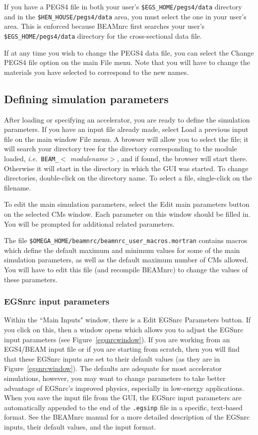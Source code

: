 \documentclass[12pt,twoside]{article}
\newcommand{\ie}{{\em i.e.}}
\begin{document}
If you have a PEGS4 file in both your user's {\tt \$EGS\_HOME/pegs4/data}
directory
and in the {\tt \$HEN\_HOUSE/pegs4/data} area, you must select the
one in your user's area.  This is
enforced because BEAMnrc first searches your user's {\tt \$EGS\_HOME/pegs4/data}
directory for the cross-sectional data file.

If at any time you wish to change the PEGS4 data file, you can select
the {\sf Change PEGS4 file} option on the main {\sf File} menu.  Note that you
will have to change the materials you have selected to correspond to the
new names.

\subsection{Defining simulation parameters}

After loading or specifying an accelerator, you are ready to define the
simulation parameters.  If
you have an input file already made, select {\sf Load a previous input
file} on the main window {\sf File} menu.  A browser will allow you to select
the file; it will search your directory tree for the directory
corresponding to the module loaded, \ie~{\tt BEAM\_}$<${\em
modulename}$>$, and if found, the browser will start
there.  Otherwise it will start in the directory in which the GUI was
started.  To change directories, double-click on the directory name.  To
select a file, single-click on the filename.

To edit the main simulation parameters, select the {\sf Edit main
parameters} button on the selected CMs window.
Each parameter on this window should be filled in.  You will be prompted
for additional related parameters.


The file {\tt \$OMEGA\_HOME/beamnrc/beamnrc\_user\_macros.mortran} contains
macros which define the default maximum and minimum values for some of
the main simulation parameters, as
well as the default maximum number of CMs allowed.  You will have to
edit this file (and recompile BEAMnrc) to change the values of these
parameters.

\subsubsection{EGSnrc input parameters}
\label{egsnrcinputsect}
Within the ``Main Inputs" window, there is a {\sf Edit EGSnrc Parameters}
button.  If you click on this, then a window opens which allows you to
adjust the EGSnrc input parameters (see Figure~\ref{egsnrcwindow}).
If you are working from an EGS4/BEAM input file or if you are starting
from scratch, then you will find that these EGSnrc inputs are set
to their default values (as they are in Figure~\ref{egsnrcwindow}).
The defaults are adequate for most accelerator simulations, however, you
may want to change parameters to take better advantage of EGSnrc's
improved physics, especially in low-energy applications.  When you save
the input file from the GUI, the EGSnrc input parameters are automatically
appended to the end of the {\tt .egsinp} file in a specific, text-based
format.  See the BEAMnrc manual for a more detailed description of the
EGSnrc inputs, their default values, and the input format.
\end{document}
